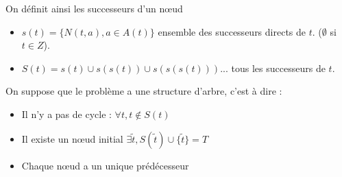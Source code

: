 On définit ainsi les successeurs d'un n{\oe}ud
\begin{itemize}
\item $s(t)=\{N(t,a),a\in A(t)\}$ ensemble des successeurs directs
de $t$. ($\emptyset$ si $t\in Z$).%
\item $S(t)= s(t)\cup s(s(t)) \cup s(s(s(t)))...$ tous les
successeurs de $t$.
\end{itemize}

On suppose que le problème a une structure d'arbre, c'est à dire :

\begin{itemize}
\item Il n'y a pas de cycle : $\forall t, t\not\in S(t)$ %
\item Il existe un  n{\oe}ud initial $\exists\tilde t, S(\tilde
t)\cup\{\tilde t\}=T$ %
\item Chaque n{\oe}ud a un unique prédécesseur
\end{itemize}

